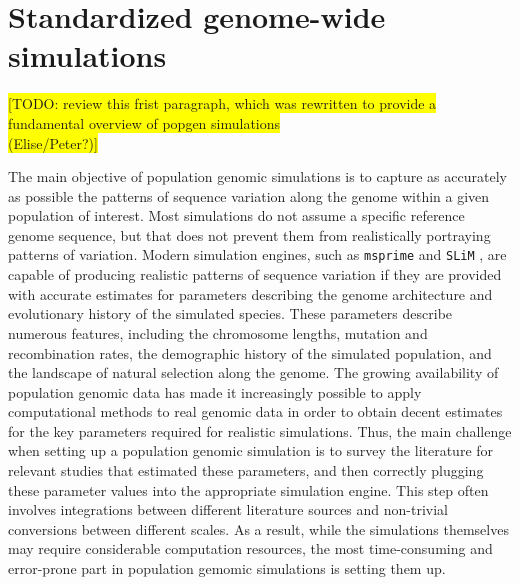 \documentclass{article}
\begin{document}
\hypertarget{sec2}{%
	\section*{Standardized genome-wide simulations}\label{sec:std-sim}}



%

\colorbox{yellow}{[TODO:  review this frist paragraph, which was rewritten to
	provide a fundamental overview of popgen simulations}\\
\colorbox{yellow}{ (Elise/Peter?)]}
	
	
The main objective of population genomic simulations is to capture as accurately as possible the patterns of sequence variation along the genome within a given population of interest. Most simulations do not assume a specific reference genome sequence, but that does not prevent them from realistically portraying patterns of variation. Modern simulation engines, such as \texttt{msprime} \citep{Kelleher2016,Nelson2020} and \texttt{SLiM} \citep{Haller2019}, are capable of producing realistic patterns of sequence variation if they are provided with accurate estimates for parameters describing the genome architecture and evolutionary history of the simulated species. These parameters describe numerous features, including the chromosome lengths,  mutation and recombination rates, the demographic history of the simulated population, and the landscape of natural selection along the genome. The growing availability of population genomic data has made it increasingly possible to apply computational methods to real genomic data in order to obtain decent estimates for the key parameters required for realistic simulations. Thus, the main challenge when setting up a population genomic simulation is to survey the literature for relevant studies that estimated these parameters, and then correctly plugging these parameter values into the appropriate simulation engine. This step often involves integrations between different literature sources and non-trivial conversions between different scales. As a result, while the simulations themselves may require considerable computation resources, the most time-consuming and error-prone part in population gemomic simulations is setting them up.
\end{document}
